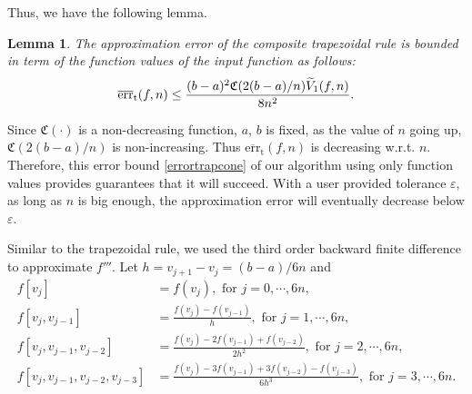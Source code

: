 \documentclass{iitthesis}
\DeclareMathOperator{\Var}{Var}
\newtheorem{lem}{Lemma}
\theoremstyle{definition}
\theoremstyle{remark}
\begin{document}
Thus, we have the following lemma.
\begin{lem}\label{lemmaerrorboundtrap}
    The approximation error of the composite trapezoidal rule is bounded in term of the function values of the input function as follows:
    \begin{equation}\label{errortrapcone}
      \overline{\textup{err}}_{\text{t}}(f,n)\leq \frac{(b-a)^2\mathfrak{C}(2(b-a)/n)\widetilde{V}_1(f,n)}{8n^2}.
    \end{equation}
\end{lem}

Since $\mathfrak{C}(\cdot)$ is a non-decreasing function, $a$, $b$ is fixed, as the value of $n$ going up, $\mathfrak{C}(2(b-a)/n)$ is non-increasing. Thus $\overline{\text{err}}_{\text{t}}(f,n)$ is decreasing w.r.t. $n$. Therefore, this error bound \eqref{errortrapcone} of our algorithm using only function values provides guarantees that it will succeed. With a user provided tolerance $\varepsilon$, as long as $n$ is big enough, the approximation error will eventually decrease below $\varepsilon$.


Similar to the trapezoidal rule, we used the third order backward finite difference to approximate $f'''$. Let $h=v_{j+1}-v_{j}=(b-a)/6n$ and
\begin{align*}
  f[v_{j}]&=f(v_{j}), \text{ for } j=0,\cdots, 6n,\\
  f[v_{j},v_{j-1}]&=\frac{f(v_{j})-f(v_{j-1})}{h},\text{ for } j=1, \cdots, 6n,\\
  f[v_{j},v_{j-1},v_{j-2}]&=\frac{f(v_{j})-2f(v_{j-1})+f(v_{j-2})}{2h^2},\text{ for } j=2, \cdots, 6n,\\
  f[v_{j},v_{j-1},v_{j-2},v_{j-3}]&=\frac{f(v_{j})-3f(v_{j-1})+3f(v_{j-2})-f(v_{j-3})}{6h^3}, \text{ for } j=3, \cdots, 6n.
\end{align*}

\end{document}
